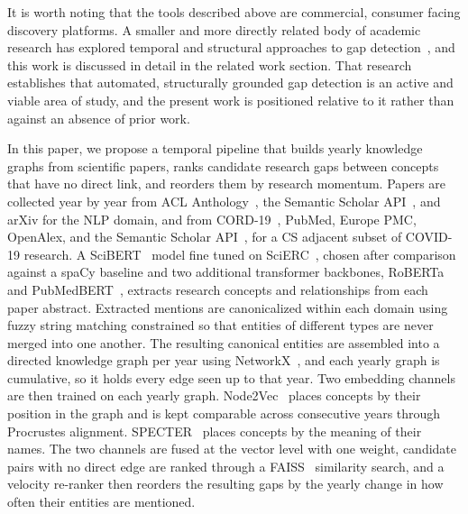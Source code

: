 \documentclass{ieeeaccess}
\begin{document}
It is worth noting that the tools described above are commercial, consumer facing discovery platforms. A smaller and more directly related body of academic research has explored temporal and structural approaches to gap detection~\cite{choudhury2019miningtemporalevolutionknowledge, jung2022generalizability, sybrandt2020agatha, dachepally2026, ghosh2026researchrag}, and this work is discussed in detail in the related work section. That research establishes that automated, structurally grounded gap detection is an active and viable area of study, and the present work is positioned relative to it rather than against an absence of prior work.

In this paper, we propose a temporal pipeline that builds yearly knowledge graphs from scientific papers, ranks candidate research gaps between concepts that have no direct link, and reorders them by research momentum. Papers are collected year by year from ACL Anthology~\cite{radev-etal-2009-acl}, the Semantic Scholar API~\cite{kinney2023semantic}, and arXiv for the NLP domain, and from CORD-19~\cite{wang2020cord}, PubMed, Europe PMC, OpenAlex, and the Semantic Scholar API~\cite{kinney2023semantic}, for a CS adjacent subset of COVID-19 research. A SciBERT~\cite{beltagy2019scibert} model fine tuned on SciERC~\cite{luan2018multi}, chosen after comparison against a spaCy baseline and two additional transformer backbones, RoBERTa~\cite{liu2019roberta} and PubMedBERT~\cite{gu2021domain}, extracts research concepts and relationships from each paper abstract. Extracted mentions are canonicalized within each domain using fuzzy string matching constrained so that entities of different types are never merged into one another. The resulting canonical entities are assembled into a directed knowledge graph per year using NetworkX~\cite{hagberg2008exploring}, and each yearly graph is cumulative, so it holds every edge seen up to that year. Two embedding channels are then trained on each yearly graph. Node2Vec~\cite{grover2016node2vec} places concepts by their position in the graph and is kept comparable across consecutive years through Procrustes alignment. SPECTER~\cite{cohan2020specter} places concepts by the meaning of their names. The two channels are fused at the vector level with one weight, candidate pairs with no direct edge are ranked through a FAISS~\cite{johnson2019billion, douze2024faiss} similarity search, and a velocity re-ranker then reorders the resulting gaps by the yearly change in how often their entities are mentioned.
\end{document}
